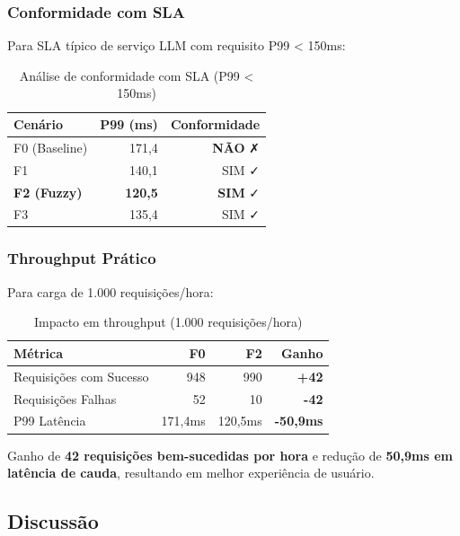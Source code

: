 \subsubsection{Conformidade com SLA}

Para SLA típico de serviço LLM com requisito P99 < 150ms:

\begin{table}[h]
\centering
\caption{Análise de conformidade com SLA (P99 < 150ms)}
\label{tab:fuzzy_sla}
\begin{tabularx}{\textwidth}{|l|r|r|}
\hline
\textbf{Cenário} & \textbf{P99 (ms)} & \textbf{Conformidade} \\
\hline
F0 (Baseline) & 171,4 & \textbf{NÃO} ✗ \\
\hline
F1 & 140,1 & SIM ✓ \\
\hline
\textbf{F2 (Fuzzy)} & \textbf{120,5} & \textbf{SIM} ✓ \\
\hline
F3 & 135,4 & SIM ✓ \\
\hline
\end{tabularx}
\end{table}

\subsubsection{Throughput Prático}

Para carga de 1.000 requisições/hora:

\begin{table}[h]
\centering
\caption{Impacto em throughput (1.000 requisições/hora)}
\label{tab:fuzzy_throughput}
\begin{tabularx}{\textwidth}{|l|r|r|r|}
\hline
\textbf{Métrica} & \textbf{F0} & \textbf{F2} & \textbf{Ganho} \\
\hline
Requisições com Sucesso & 948 & 990 & \textbf{+42} \\
\hline
Requisições Falhas & 52 & 10 & \textbf{-42} \\
\hline
P99 Latência & 171,4ms & 120,5ms & \textbf{-50,9ms} \\
\hline
\end{tabularx}
\end{table}

Ganho de \textbf{42 requisições bem-sucedidas por hora} e redução de \textbf{50,9ms em latência de cauda}, resultando em melhor experiência de usuário.

\subsection{Discussão}

